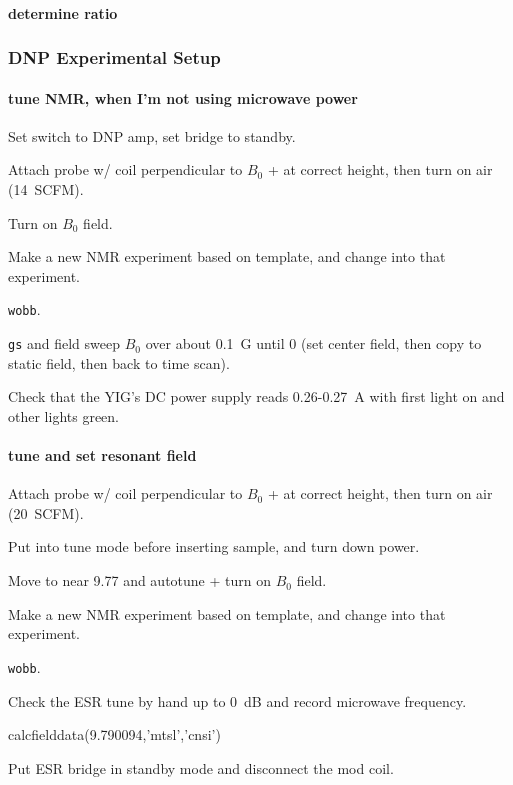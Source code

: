 \paragraph{determine ratio}
\subsubsection{DNP Experimental Setup}

\paragraph{tune NMR, when I'm not using microwave power}
Set switch to DNP amp, set bridge to standby.

Attach probe w/ coil perpendicular to $B_0$ + at correct height, then turn on air (14~SCFM).

Turn on $B_0$ field.

Make a new NMR experiment based on template, and change into that experiment.

\texttt{wobb}. 

\texttt{gs} and field sweep $B_0$ over about 0.1~G until 0 (set center field, then copy to static field, then back to time scan).

Check that the YIG's DC power supply reads 0.26-0.27~A with first light on and other lights green.

\paragraph{tune and set resonant field}
Attach probe w/ coil perpendicular to $B_0$ + at correct height, then turn on air (20~SCFM).

Put into tune mode before inserting sample, and turn down power.

Move to near 9.77 and autotune + turn on $B_0$ field.

Make a new NMR experiment based on template, and change into that experiment.

\texttt{wobb}. 

Check the ESR tune by hand up to 0~dB and record microwave frequency.
\begin{python}[off]
calcfielddata(9.790094,'mtsl','cnsi')
\end{python}
Put ESR bridge in standby mode and disconnect the mod coil.

